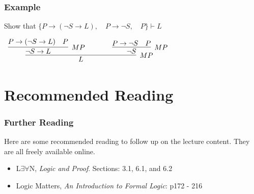 \documentclass{beamer}
\theoremstyle{indentDefn} \newtheorem{defn}[]{Definition}
\begin{document}
\begin{frame}
	\frametitle{Example}
	
	Show that $\{P \rightarrow (\lnot S\rightarrow L), \hspace{1em} P\rightarrow \lnot S, \hspace{1em} P\} \vdash L$
	
	\pause
	
	\vspace{2cm}
	
	\begin{center}
		$\begin{array}{c}
			\infer[MP]{L}{\infer[MP\hspace{1cm}]{\lnot S \rightarrow L}{ P \rightarrow (\lnot S\rightarrow L) & P } 
							&
						  \infer[MP]{\lnot S}{ P \rightarrow \lnot S & P }
					  	 	}
		\end{array}$
		
	\end{center}
	
	\vspace{5cm}
	
\end{frame}


\section{Recommended Reading}
\begin{frame}
  \frametitle{Further Reading}

  Here are some recommended reading to follow up on the lecture content. They are all freely available online. 

  \vspace{0.5cm}

  \begin{itemize}
    \item L$\exists \forall$N, \emph{Logic and Proof}. Sections: 3.1, 6.1, and 6.2 
    \item Logic Matters, \emph{An Introduction to Formal Logic}: p172 - 216
  \end{itemize}


\end{frame}
\end{document}
